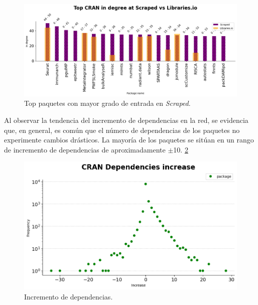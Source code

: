 \begin{figure}[ht!]
    \begin{center}
        \includegraphics[width=1\textwidth]{img/cran/top_ind_scraped.png}
        \caption{Top paquetes con mayor grado de entrada en \textit{Scraped}.}
        \label{fig:top_ind_scraped_cran}
    \end{center}
\end{figure}


Al observar la tendencia del incremento de dependencias en la red, se evidencia que, en
general, es común que el número de dependencias de los paquetes no experimente cambios
drásticos. La mayoría de los paquetes se sitúan en un rango de incremento de dependencias
de aproximadamente $\pm$10. \ref{fig:cran_dependencies_increase}


\begin{figure}[ht!]
    \begin{center}
        \includegraphics[width=1\textwidth]{img/cran/dependencies_increase.png}
        \caption{Incremento de dependencias.}
        \label{fig:cran_dependencies_increase}
    \end{center}
\end{figure}

